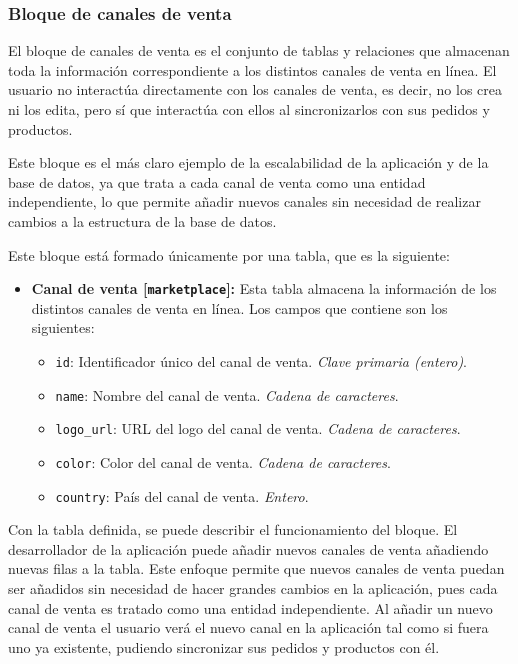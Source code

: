 \subsubsection{Bloque de canales de venta}

El bloque de canales de venta es el conjunto de tablas y relaciones que almacenan toda la información correspondiente a los distintos canales de venta en línea. El usuario no interactúa directamente con los canales de venta, es decir, no los crea ni los edita, pero sí que interactúa con ellos al sincronizarlos con sus pedidos y productos.

Este bloque es el más claro ejemplo de la escalabilidad de la aplicación y de la base de datos, ya que trata a cada canal de venta como una entidad independiente, lo que permite añadir nuevos canales sin necesidad de realizar cambios a la estructura de la base de datos.

Este bloque está formado únicamente por una tabla, que es la siguiente:
\begin{itemize}
    \item \textbf{Canal de venta [\texttt{marketplace}]:} Esta tabla almacena la información de los distintos canales de venta en línea. Los campos que contiene son los siguientes:
          \begin{itemize}
              \item \texttt{id}: Identificador único del canal de venta. \textit{Clave primaria (entero)}.
              \item \texttt{name}: Nombre del canal de venta. \textit{Cadena de caracteres}.
              \item \texttt{logo\_url}: URL del logo del canal de venta. \textit{Cadena de caracteres}.
              \item \texttt{color}: Color del canal de venta. \textit{Cadena de caracteres}.
              \item \texttt{country}: País del canal de venta. \textit{Entero}.
          \end{itemize}
\end{itemize}

Con la tabla definida, se puede describir el funcionamiento del bloque. El desarrollador de la aplicación puede añadir nuevos canales de venta añadiendo nuevas filas a la tabla. Este enfoque permite que nuevos canales de venta puedan ser añadidos sin necesidad de hacer grandes cambios en la aplicación, pues cada canal de venta es tratado como una entidad independiente. Al añadir un nuevo canal de venta el usuario verá el nuevo canal en la aplicación tal como si fuera uno ya existente, pudiendo sincronizar sus pedidos y productos con él.

